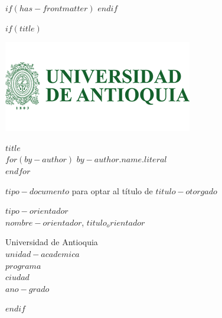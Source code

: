 $if(has-frontmatter)$
\frontmatter
$endif$

$if(title)$
\cleardoublepage

\thispagestyle{empty}

{\centering

\includegraphics{escudo_udea.png}

\vspace{2cm}
{\bfseries $title$}\\[2cm]

\vspace{2cm}
$for(by-author)$
{$by-author.name.literal$\\}
$endfor$

\vspace{2cm}
{$tipo-documento$ para optar al título de $titulo-otorgado$}

\vspace{2cm}
{$tipo-orientador$\\} 
{$nombre-orientador$, $titulo_orientador$}

\vspace{1cm}
{Universidad de Antioquia\\}
{$unidad-academica$\\}
{$programa$\\}
{$ciudad$\\}
{$ano-grado$}

}
$endif$
